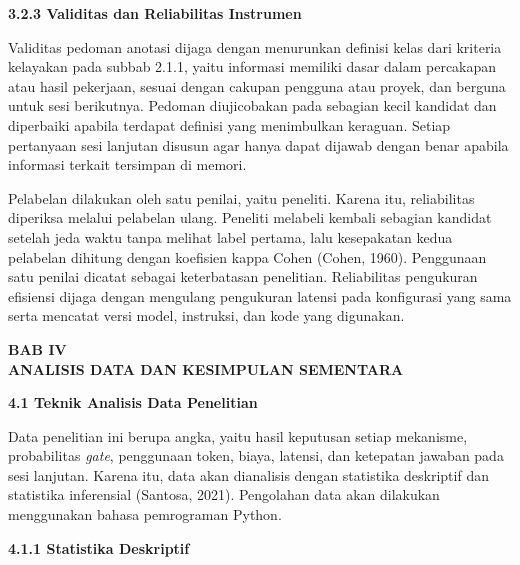 \documentclass[12pt,a4paper]{article}
\newcommand{\asing}[1]{\textit{#1}}
\newcommand{\bab}[3]{%
  \clearpage\phantomsection\label{#3}%
  \begin{center}\large\bfseries BAB #1\\[0.2em] #2\end{center}\vspace{0.8em}}
\newcommand{\subbab}[2]{%
  \par\vspace{0.8em}\phantomsection\label{#2}%
  \noindent\textbf{#1}\par\nopagebreak\vspace{0.3em}}
\newcommand{\subsubbab}[2]{%
  \par\vspace{0.5em}\phantomsection\label{#2}%
  \noindent\textbf{#1}\par\nopagebreak\vspace{0.2em}}
\begin{document}
\subsubbab{3.2.3 Validitas dan Reliabilitas Instrumen}{sec:3.2.3}

Validitas pedoman anotasi dijaga dengan menurunkan definisi kelas dari kriteria kelayakan pada subbab 2.1.1, yaitu informasi memiliki dasar dalam percakapan atau hasil pekerjaan, sesuai dengan cakupan pengguna atau proyek, dan berguna untuk sesi berikutnya. Pedoman diujicobakan pada sebagian kecil kandidat dan diperbaiki apabila terdapat definisi yang menimbulkan keraguan. Setiap pertanyaan sesi lanjutan disusun agar hanya dapat dijawab dengan benar apabila informasi terkait tersimpan di memori.

Pelabelan dilakukan oleh satu penilai, yaitu peneliti. Karena itu, reliabilitas diperiksa melalui pelabelan ulang. Peneliti melabeli kembali sebagian kandidat setelah jeda waktu tanpa melihat label pertama, lalu kesepakatan kedua pelabelan dihitung dengan koefisien kappa Cohen (Cohen, 1960). Penggunaan satu penilai dicatat sebagai keterbatasan penelitian. Reliabilitas pengukuran efisiensi dijaga dengan mengulang pengukuran latensi pada konfigurasi yang sama serta mencatat versi model, instruksi, dan kode yang digunakan.

\bab{IV}{ANALISIS DATA DAN KESIMPULAN SEMENTARA}{sec:bab4}

\subbab{4.1 Teknik Analisis Data Penelitian}{sec:4.1}

Data penelitian ini berupa angka, yaitu hasil keputusan setiap mekanisme, probabilitas \asing{gate}, penggunaan token, biaya, latensi, dan ketepatan jawaban pada sesi lanjutan. Karena itu, data akan dianalisis dengan statistika deskriptif dan statistika inferensial (Santosa, 2021). Pengolahan data akan dilakukan menggunakan bahasa pemrograman Python.

\subsubbab{4.1.1 Statistika Deskriptif}{sec:4.1.1}
\end{document}
